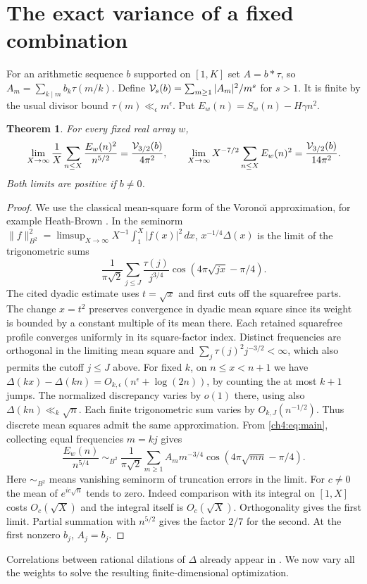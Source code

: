 \documentclass[11pt,a4paper,oneside,openany]{report}
\newtheorem{theorem}{Theorem}[section]
\theoremstyle{remark}\newtheorem{remark}[theorem]{Remark}
\numberwithin{equation}{section}
\begin{document}
\section{The exact variance of a fixed combination}\label{ch4:sec:variance}
For an arithmetic sequence $b$ supported on $[1,K]$ set $A=b*\tau$, so $A_m=\sum_{k\mid m}b_k\tau(m/k)$. Define $\mathcal V_s(b)=\sum_{m\ge1}|A_m|^2/m^s$ for $s>1$. It is finite by the usual divisor bound $\tau(m)\ll_\epsilon m^\epsilon$. Put $E_w(n)=S_w(n)-H\gamma n^2$.
\begin{theorem}\label{ch4:th:variance}
For every fixed real array $w$,
\[
 \lim_{X\to\infty}\frac1X\sum_{n\le X}\frac{E_w(n)^2}{n^{5/2}}
   =\frac{\mathcal V_{3/2}(b)}{4\pi^2},\qquad
 \lim_{X\to\infty}X^{-7/2}\sum_{n\le X}E_w(n)^2=\frac{\mathcal V_{3/2}(b)}{14\pi^2}.
\]
Both limits are positive if $b\ne0$.
\end{theorem}
\begin{proof}
We use the classical mean-square form of the Vorono\u\i{} approximation, for example Heath-Brown \cite[\S5, eq.~(5.2)]{hb}. In the seminorm $\|f\|_{B^2}^2=\limsup_{X\to\infty}X^{-1}\int_1^X|f(x)|^2\,dx$, $x^{-1/4}\Delta(x)$ is the limit of the trigonometric sums
\[
 \frac1{\pi\sqrt2}\sum_{j\le J}\frac{\tau(j)}{j^{3/4}}\cos(4\pi\sqrt{jx}-\pi/4).
\]
The cited dyadic estimate uses $t=\sqrt x$ and first cuts off the squarefree parts. The change $x=t^2$ preserves convergence in dyadic mean square since its weight is bounded by a constant multiple of its mean there. Each retained squarefree profile converges uniformly in its square-factor index. Distinct frequencies are orthogonal in the limiting mean square and $\sum_j\tau(j)^2j^{-3/2}<\infty$, which also permits the cutoff $j\le J$ above.
For fixed $k$, on $n\le x<n+1$ we have $\Delta(kx)-\Delta(kn)=O_{k,\epsilon}(n^\epsilon+\log(2n))$, by counting the at most $k+1$ jumps. The normalized discrepancy varies by $o(1)$ there, using also $\Delta(kn)\ll_k\sqrt n$. Each finite trigonometric sum varies by $O_{k,J}(n^{-1/2})$. Thus discrete mean squares admit the same approximation. From \eqref{ch4:eq:main}, collecting equal frequencies $m=kj$ gives
\begin{equation}\label{ch4:eq:cos}
 \frac{E_w(n)}{n^{5/4}}\ \sim_{B^2}\
 \frac1{\pi\sqrt2}\sum_{m\ge1}A_m m^{-3/4}\cos(4\pi\sqrt{mn}-\pi/4).
\end{equation}
Here $\sim_{B^2}$ means vanishing seminorm of truncation errors in the limit. For $c\ne0$ the mean of $e^{ic\sqrt n}$ tends to zero. Indeed comparison with its integral on $[1,X]$ costs $O_c(\sqrt X)$ and the integral itself is $O_c(\sqrt X)$. Orthogonality gives the first limit. Partial summation with $n^{5/2}$ gives the factor $2/7$ for the second. At the first nonzero $b_j$, $A_j=b_j$.
\end{proof}
Correlations between rational dilations of $\Delta$ already appear in \cite{amrs}. We now vary all the weights to solve the resulting finite-dimensional optimization.
\end{document}
